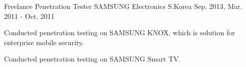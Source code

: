 \begin{cventries}
    \cventry
    {Freelance Penetration Tester} %
    {SAMSUNG Electronics} %
    {S.Korea} %
    {Sep. 2013, Mar. 2011 - Oct. 2011} %
    {
        \begin{cvitems} %
            \item {Conducted penetration testing on SAMSUNG KNOX, which is solution for enterprise mobile security.}
            \item {Conducted penetration testing on SAMSUNG Smart TV.}
        \end{cvitems}
    }

\end{cventries}
